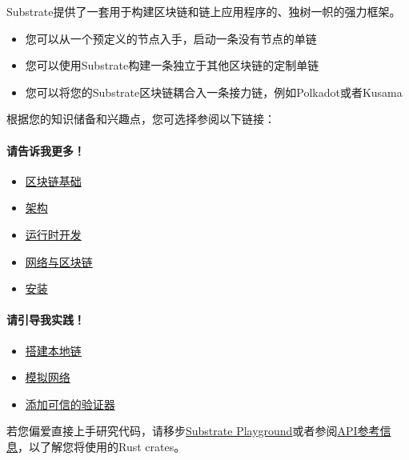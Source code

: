 Substrate提供了一套用于构建区块链和链上应用程序的、独树一帜的强力框架。

\begin{itemize}
\item
  您可以从一个预定义的节点入手，启动一条没有节点的单链
\item
  您可以使用Substrate构建一条独立于其他区块链的定制单链
\item
  您可以将您的Substrate区块链耦合入一条接力链，例如Polkadot或者Kusama
\end{itemize}

根据您的知识储备和兴趣点，您可选择参阅以下链接：

\hypertarget{ux8bf7ux544aux8bc9ux6211ux66f4ux591a}{%
\paragraph{请告诉我更多！}\label{ux8bf7ux544aux8bc9ux6211ux66f4ux591a}}

\begin{itemize}
\item
  \href{/fundamentals/blockchain-basics/}{区块链基础}
\item
  \href{/fundamentals/architecture/}{架构}
\item
  \href{/fundamentals/runtime-development}{运行时开发}
\item
  \href{/fundamentals/node-and-network-types/}{网络与区块链}
\item
  \href{/install/}{安装}
\end{itemize}

\hypertarget{ux8bf7ux5f15ux5bfcux6211ux5b9eux8df5}{%
\paragraph{请引导我实践！}\label{ux8bf7ux5f15ux5bfcux6211ux5b9eux8df5}}

\begin{itemize}
\item
  \href{/tutorials/get-started/build-local-blockchain/}{搭建本地链}
\item
  \href{/tutorials/get-started/simulate-network/}{模拟网络}
\item
  \href{/tutorials/get-started/add-trusted-nodes/}{添加可信的验证器}
\end{itemize}

若您偏爱直接上手研究代码，请移步\href{https://docs.substrate.io/playground/}{Substrate
Playground}或者参阅\href{https://paritytech.github.io/substrate/master}{API参考信息}，以了解您将使用的Rust
crates。

